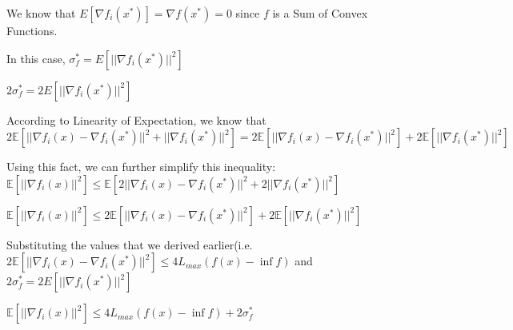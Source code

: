 We know that $E[\nabla f_i(x^*)] = \nabla f(x^*) = 0$ since $f$ is a Sum of Convex Functions. \newline 

In this case, 
\noindent $\sigma_f^* = E[||\nabla f_i(x^*)||^2]$ \newline 

$2 \sigma_f^* = 2 E[||\nabla f_i(x^*)||^2]$ \newline 

According to Linearity of Expectation, we know that \newline 
$2\mathbb{E} [||\nabla f_i(x) - \nabla f_i(x^*)||^2 + ||\nabla f_i(x^*)||^2] = 2\mathbb{E} [||\nabla f_i(x) - \nabla f_i(x^*)||^2] + 2 \mathbb{E}  [||\nabla f_i(x^*)||^2]$


Using this fact, we can further simplify this inequality: \noindent $\mathbb{E}[||\nabla f_i(x)||^2] \leq \mathbb{E} [2||\nabla f_i(x) - \nabla f_i(x^*)||^2 + 2||\nabla f_i(x^*)||^2]$ \newline 

\noindent $\mathbb{E}[||\nabla f_i(x)||^2] \leq 2\mathbb{E} [||\nabla f_i(x) - \nabla f_i(x^*)||^2] + 2 \mathbb{E}  [||\nabla f_i(x^*)||^2]$ \newline 

Substituting the values that we derived earlier(i.e. $2\mathbb{E}[||\nabla f_i(x) - \nabla f_i(x^*)||^2] \leq 4L_{max} (f(x) - \inf f)$ and $2 \sigma_f^* = 2 E[||\nabla f_i(x^*)||^2]$ \newline 

\noindent $\mathbb{E}[||\nabla f_i(x)||^2] \leq 4L_{max} (f(x) - \inf f) + 2 \sigma_f^*$